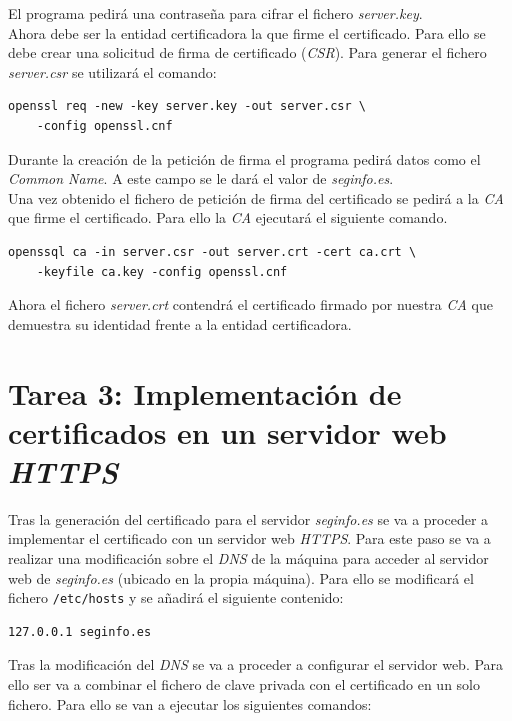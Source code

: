 \documentclass[10pt,a4paper]{article}
\begin{document}
El programa pedirá una contraseña para cifrar el fichero \emph{server.key}.\\
Ahora debe ser la entidad certificadora la que firme el certificado. Para ello se debe crear una solicitud de firma de certificado (\emph{CSR}). Para generar el fichero \emph{server.csr} se utilizará el comando:

\begin{lstlisting}
openssl req -new -key server.key -out server.csr \ 
	-config openssl.cnf
\end{lstlisting}

Durante la creación de la petición de firma el programa pedirá datos como el \emph{Common Name}. A este campo se le dará el valor de \emph{seginfo.es}.\\
Una vez obtenido el fichero de petición de firma del certificado se pedirá a la \emph{CA} que firme el certificado. Para ello la \emph{CA} ejecutará el siguiente comando.

\begin{lstlisting}
openssql ca -in server.csr -out server.crt -cert ca.crt \
	-keyfile ca.key -config openssl.cnf
\end{lstlisting}

Ahora el fichero \emph{server.crt} contendrá el certificado firmado por nuestra \emph{CA} que demuestra su identidad frente a la entidad certificadora.


\section{Tarea 3: Implementación de certificados en un servidor web \emph{HTTPS}}

Tras la generación del certificado para el servidor \emph{seginfo.es} se va a proceder a implementar el certificado con un servidor web \emph{HTTPS}. Para este paso se va a realizar una modificación sobre el \emph{DNS} de la máquina para acceder al servidor web de \emph{seginfo.es} (ubicado en la propia máquina). Para ello se modificará el fichero \texttt{/etc/hosts} y se añadirá el siguiente contenido:

\begin{lstlisting}
127.0.0.1 seginfo.es
\end{lstlisting}

Tras la modificación del \emph{DNS} se va a proceder a configurar el servidor web. Para ello ser va a combinar el fichero de clave privada con el certificado en un solo fichero. Para ello se van a ejecutar los siguientes comandos:
\end{document}
